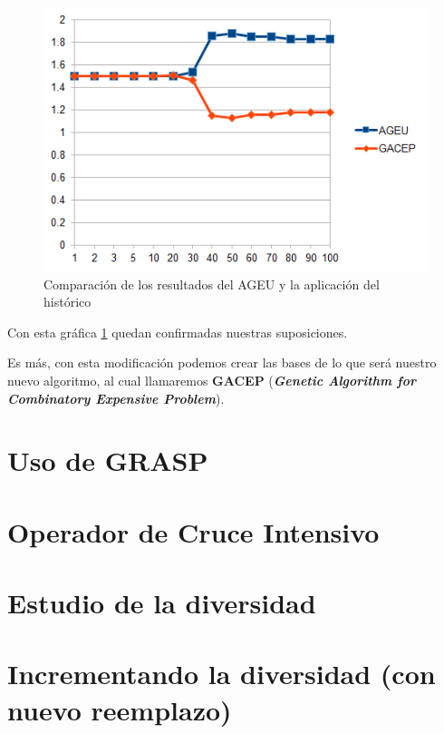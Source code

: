 \begin{figure}[H]
		\centering
		\includegraphics[scale=0.8]{imagenes/Experimental/AGEUvsGACEP.png}
        \caption{Comparación de los resultados del AGEU y la aplicación del histórico}
        \label{fig:AGEUvsGACEP}
\end{figure}

Con esta gráfica \ref{fig:AGEUvsGACEP} quedan confirmadas nuestras suposiciones. 

Es más, con esta modificación podemos crear las bases de lo que será nuestro nuevo algoritmo, al cual llamaremos \textbf{GACEP} (\textbf{\textit{Genetic Algorithm for Combinatory Expensive Problem}}).

\section{Uso de GRASP}



\section{Operador de Cruce Intensivo}



\section{Estudio de la diversidad}



\section{Incrementando la diversidad (con nuevo reemplazo)}



